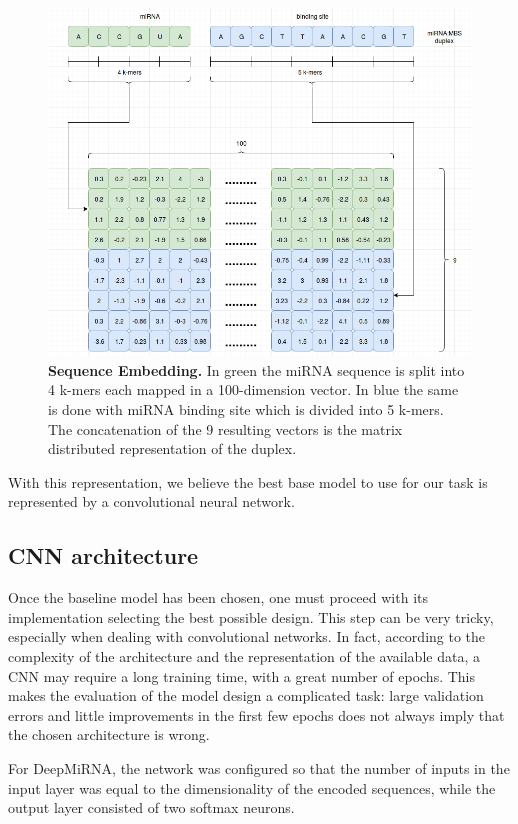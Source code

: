 \begin{figure}[hbt!]
	\centering
	\includegraphics[width=\textwidth, height=0.4\textheight]{Figures/dna_embedding}
	\caption{\textbf{Sequence Embedding.} In green the miRNA sequence is split into 4 k-mers each mapped in a 100-dimension vector. In blue the same is done with miRNA binding site which is divided into 5 k-mers. The concatenation of the 9 resulting vectors is the matrix distributed representation of the duplex.}
	\label{fig:dna_embedding}
\end{figure}

With this representation, we believe the best base model to use for our task is represented by a convolutional neural network. 

\subsection{CNN architecture}
Once the baseline model has been chosen, one must proceed with its implementation selecting the best possible design. This step can be very tricky, especially when dealing with convolutional networks.  In fact, according to the complexity of the architecture and the representation of the available data, a CNN may require a long training time, with a great number of epochs. This makes the evaluation of the model design a complicated task: large validation errors and little improvements in the first few epochs does not always imply that the chosen architecture is wrong.   

For DeepMiRNA, the network was configured so that the number of inputs in the input layer was equal to the dimensionality of the encoded sequences,  while the output layer consisted of two softmax neurons. 

